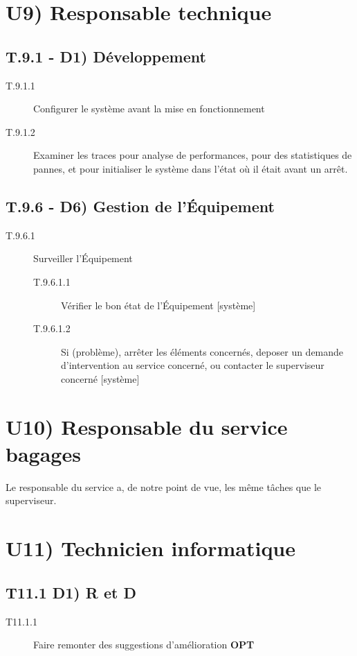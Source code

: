 \section{U9) Responsable technique}

	\subsection{T.9.1 - D1) Développement}
	\begin{description}
	\item[T.9.1.1] Configurer le système avant la mise en fonctionnement
	\item[T.9.1.2] Examiner les traces pour analyse de performances, pour des statistiques de pannes, et pour initialiser le système dans l'état où il était avant un arrêt.
	\end{description}
	
	\subsection{T.9.6 - D6) Gestion de l'Équipement}
	\begin{description}
	\item[T.9.6.1] Surveiller l'Équipement
		\begin{description}
		\item[T.9.6.1.1] Vérifier le bon état de l'Équipement [système]
		\item[T.9.6.1.2] Si (problème), arrêter les éléments concernés, deposer un
		demande d'intervention au service concerné, ou contacter le superviseur concerné [système]
		\end{description}
	\end{description}

	
\section{U10) Responsable du service bagages}

Le responsable du service a, de notre point de vue, les même tâches que le
superviseur.

\section{U11) Technicien informatique}
	\subsection{T11.1 D1) R et D}
	\begin{description}
	\item[T11.1.1] Faire remonter des suggestions d'amélioration \textbf{OPT}
	\end{description}
	
